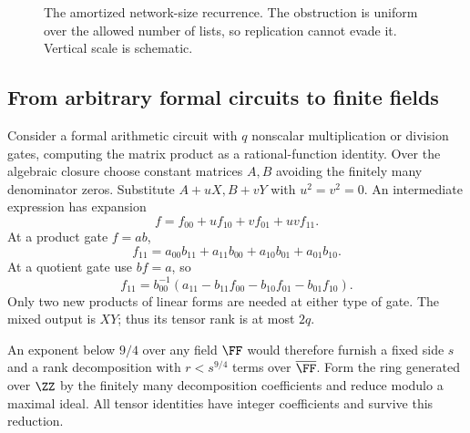 \begin{figure}[htbp]
\centering
{}
\caption{The amortized network-size recurrence. The obstruction is uniform over the allowed number of lists, so replication cannot evade it. Vertical scale is schematic.}
\end{figure}

\subsection{From arbitrary formal circuits to finite fields}

Consider a formal arithmetic circuit with \(q\) nonscalar multiplication or division gates, computing the matrix product as a rational-function identity. Over the algebraic closure choose constant matrices \(A,B\) avoiding the finitely many denominator zeros. Substitute \(A+uX,B+vY\) with \(u^2=v^2=0\). An intermediate expression has expansion
\[
 f=f_{00}+uf_{10}+vf_{01}+uvf_{11}.
\]
At a product gate \(f=ab\),
\[
 f_{11}=a_{00}b_{11}+a_{11}b_{00}+a_{10}b_{01}+a_{01}b_{10}.
\]
At a quotient gate use \(bf=a\), so
\[
 f_{11}=b_{00}^{-1}(a_{11}-b_{11}f_{00}-b_{10}f_{01}-b_{01}f_{10}).
\]
Only two new products of linear forms are needed at either type of gate. The mixed output is \(XY\); thus its tensor rank is at most \(2q\).

An exponent below \(9/4\) over any field \(\FF\) would therefore furnish a fixed side \(s\) and a rank decomposition with \(r<s^{9/4}\) terms over \(\overline{\FF}\). Form the ring generated over \(\ZZ\) by the finitely many decomposition coefficients and reduce modulo a maximal ideal. All tensor identities have integer coefficients and survive this reduction.

